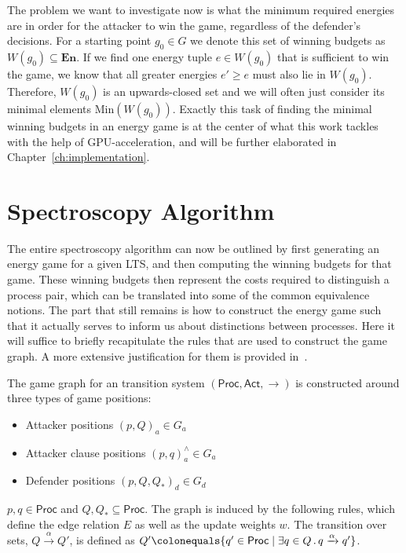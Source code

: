 The problem we want to investigate now is
what the minimum required energies are
in order for the attacker to win the game,
regardless of the defender's decisions.
For a starting point $g_0 \in G$ we denote this set of winning budgets as
$W(g_0) \subseteq \mathbf{En}$.
If we find one energy tuple $e \in W(g_0)$ that is sufficient to win the game,
we know that all greater energies $e' \geq e$ must also lie in $W(g_0)$.
Therefore, $W(g_0)$ is an upwards-closed set and we will often just consider
its minimal elements $\mathrm{Min}(W(g_0))$.
Exactly this task of finding the minimal winning budgets in an energy game
is at the center of what this work tackles with the help of GPU-acceleration,
and will be further elaborated in Chapter~\ref{ch:implementation}.


\section{Spectroscopy Algorithm}

The entire spectroscopy algorithm can now be outlined by
first generating an energy game for a given LTS,
and then computing the winning budgets for that game.
These winning budgets then represent the costs required to distinguish a
process pair,
which can be translated into some of the common equivalence notions.
The part that still remains is how to construct the energy game
such that it actually serves to inform us about distinctions between processes.
Here it will suffice to briefly recapitulate the rules that are used to
construct the game graph.
A more extensive justification for them is provided in~\cite{bisping2023process}.

The game graph for an transition system
$(\mathsf{Proc}, \mathsf{Act}, {\rightarrow})$
is constructed around three types of game positions:

\begin{itemize}
    \item Attacker positions ${(p, Q)}_a \in G_a$
    \item Attacker clause positions ${(p, q)}_a^{\scriptscriptstyle\land} \in G_a$
    \item Defender positions ${(p, Q, Q_*)}_d \in G_d$
\end{itemize}

$p, q \in \mathsf{Proc}$ and $Q, Q_* \subseteq \mathsf{Proc}$.
The graph is induced by the following rules,
which define the edge relation $E$ as well as the update weights $w$.
The transition over sets, $Q \xrightarrow{\alpha} Q'$,
is defined as
$Q' \colonequals \{q' \in \mathsf{Proc} \mid
    \exists q \in Q\,.\,q \xrightarrow{\alpha} q'\}$.


